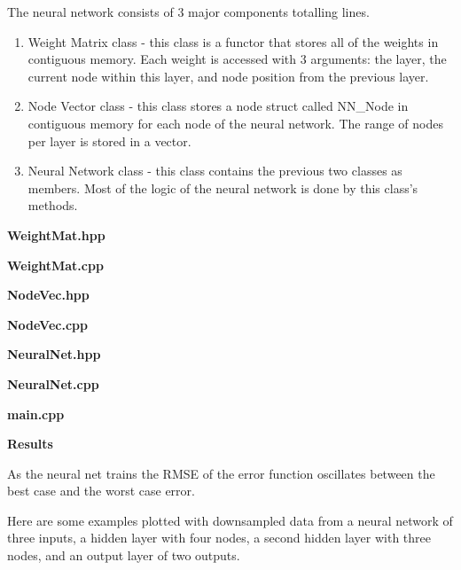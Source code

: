 \documentclass[14pt]{article}
\begin{document}
\begin{flushleft}
The neural network consists of 3 major components totalling lines.
\begin{enumerate}
	\item Weight Matrix class - this class is a functor that stores all of the weights in contiguous memory.
		Each weight is accessed with 3 arguments:
		the layer, the current node within this layer, and node position from the previous layer.
	\item Node Vector class - this class stores a node struct called NN\_Node in contiguous memory
		for each node of the neural network. The range of nodes per layer is stored in a vector.
	\item Neural Network class - this class contains the previous two classes as members.
		Most of the logic of the neural network is done by this class's methods.
\end{enumerate}


	\textbf{WeightMat.hpp}

	\textbf{WeightMat.cpp}


	\textbf{NodeVec.hpp}

	\textbf{NodeVec.cpp}


	\textbf{NeuralNet.hpp}

	\textbf{NeuralNet.cpp}


	\textbf{main.cpp}

\newpage
\textbf{Results}


As the neural net trains the RMSE of the error function oscillates between the best case and the worst case error.

Here are some examples plotted with downsampled data from
a neural network of three inputs, a hidden layer with four nodes, a second hidden layer with three nodes,
and an output layer of two outputs.



\end{flushleft}
\end{document}
